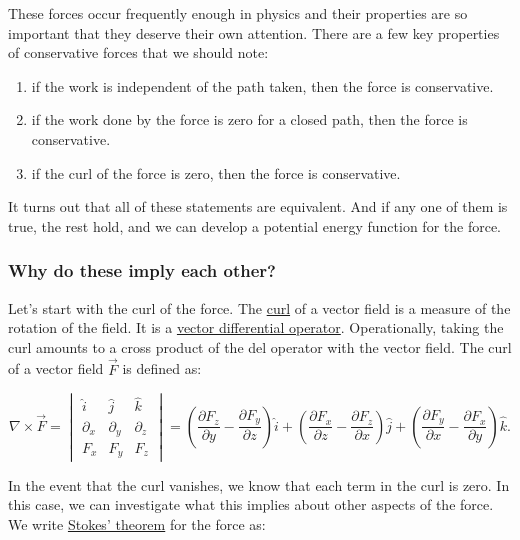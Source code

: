 \documentclass[11pt]{article}
\providecommand{\tightlist}{%
      \setlength{\itemsep}{0pt}\setlength{\parskip}{0pt}}
\begin{document}
These forces occur frequently enough in physics and their properties are
so important that they deserve their own attention. There are a few key
properties of conservative forces that we should note:

\begin{enumerate}
\def\labelenumi{\arabic{enumi}.}
\tightlist
\item
  if the work is independent of the path taken, then the force is
  conservative.
\item
  if the work done by the force is zero for a closed path, then the
  force is conservative.
\item
  if the curl of the force is zero, then the force is conservative.
\end{enumerate}

It turns out that all of these statements are equivalent. And if any one
of them is true, the rest hold, and we can develop a potential energy
function for the force.

\subsubsection{Why do these imply each
other?}\label{why-do-these-imply-each-other}

Let's start with the curl of the force. The
\href{https://en.wikipedia.org/wiki/Curl}{curl} of a vector field is a
measure of the rotation of the field. It is a
\href{https://en.wikipedia.org/wiki/Vector_calculus_operator}{vector
differential operator}. Operationally, taking the curl amounts to a
cross product of the del operator with the vector field. The curl of a
vector field \(\vec{F}\) is defined as:

\[\nabla \times \vec{F} = \begin{vmatrix}\hat{i} & \hat{j} & \hat{k} \\ \partial_x & \partial_y & \partial_z \\ F_x & F_y & F_z \end{vmatrix} = \left(\dfrac{\partial F_z}{\partial y} - \dfrac{\partial F_y}{\partial z}\right)\hat{i} + \left(\dfrac{\partial F_x}{\partial z} - \dfrac{\partial F_z}{\partial x}\right)\hat{j} + \left(\dfrac{\partial F_y}{\partial x} - \dfrac{\partial F_x}{\partial y}\right)\hat{k}.\]

In the event that the curl vanishes, we know that each term in the curl
is zero. In this case, we can investigate what this implies about other
aspects of the force. We write
\href{https://en.wikipedia.org/wiki/Stokes\%27_theorem}{Stokes' theorem}
for the force as:
\end{document}
